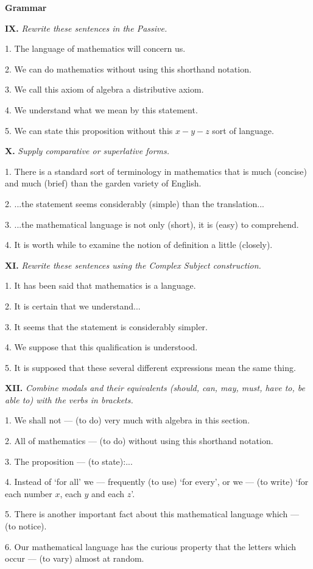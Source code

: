\documentclass[a4paper]{article}
\newcommand{\ESect}[1]{\medskip\par{\large \textbf{#1}}\par}
\newcommand{\ETask}[2]{\medskip\par\textbf{#1.} \textit{#2}\par}
\begin{document}
\ESect{Grammar}
\ETask{IX}{Rewrite these sentences in the Passive.}
1. The language of mathematics will concern us.

2. We can do mathematics without using this shorthand notation.

3. We call this axiom of algebra a distributive axiom.

4. We understand what we mean by this statement.

5. We can state this proposition without this $x-y-z$ sort of language.

\ETask{X}{Supply comparative or superlative forms.}
1. There is a standard sort of terminology in mathematics that is much (concise) and much (brief) than the garden variety of English.

2. ...the statement seems considerably (simple) than the translation...

3. ...the mathematical language is not only (short), it is (easy) to comprehend.

4. It is worth while to examine the notion of definition a little (closely).

\ETask{XI}{Rewrite these sentences using the Complex Subject construction.}

1. It has been said that mathematics is a language.

2. It is certain that we understand...

3. It seems that the statement is considerably simpler.

4. We suppose that this qualification is understood.

5. It is supposed that these several different expressions mean the same thing.

\ETask{XII}{Combine modals and their equivalents (should, can, may, must, have to, be able to) with the verbs in brackets.}

1. We shall not --- (to do) very much with algebra in this section.

2. All of mathematics --- (to do) without using this shorthand notation.

3. The proposition --- (to state):...

4. Instead of `for all' we --- frequently (to use) `for every', or we --- (to write) `for each number $x$, each $y$ and each $z$'.

5. There is another important fact about this mathematical language which --- (to notice).

6. Our mathematical language has the curious property that the letters which occur --- (to vary) almost at random.
\end{document}
